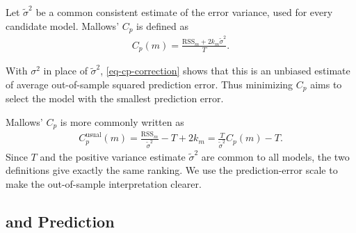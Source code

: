 \documentclass[a4paper,12pt]{article}
\begin{document}
\begin{definition}[Mallows' $C_p$]
    Let $\widetilde\sigma^2$ be a common consistent estimate of the error variance, used for every candidate model.
	Mallows' $C_p$ is defined as
    \begin{align}
        C_p(m)=\frac{\mathrm{RSS}_m+2k_m\widetilde\sigma^2}{T}.
    \end{align}
\end{definition}

\begin{remark}[Interpretation of $C_p$]
    With $\sigma^2$ in place of $\widetilde\sigma^2$, \eqref{eq-cp-correction} shows that
    this is an unbiased estimate of average out-of-sample squared prediction error.
    Thus minimizing $C_p$ aims to select the model with the smallest prediction error.
\end{remark}

\begin{remark}
    Mallows' $C_p$ is more commonly written as
    \begin{align}\label{eq-cp-usual}
        C_p^{\mathrm{usual}}(m)
        =\frac{\mathrm{RSS}_m}{\widetilde\sigma^2}-T+2k_m
        =\frac{T}{\widetilde\sigma^2}C_p(m)-T.
    \end{align}
    Since $T$ and the positive variance estimate $\widetilde\sigma^2$ are common to all models,
    the two definitions give exactly the same ranking.
    We use the prediction-error scale to make the out-of-sample interpretation clearer.
\end{remark}

\subsection{ and Prediction}
\end{document}
